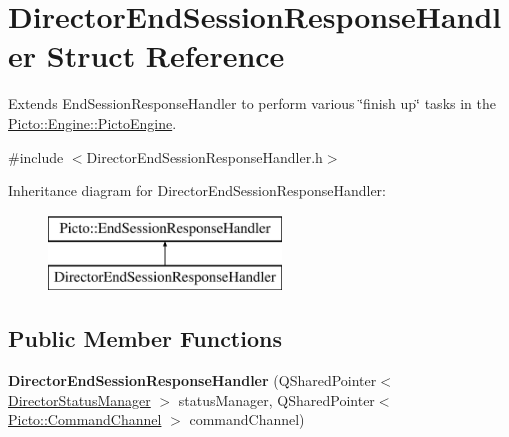\hypertarget{struct_director_end_session_response_handler}{\section{Director\-End\-Session\-Response\-Handler Struct Reference}
\label{struct_director_end_session_response_handler}
}


Extends End\-Session\-Response\-Handler to perform various \char`\"{}finish up\char`\"{} tasks in the \hyperlink{class_picto_1_1_engine_1_1_picto_engine}{Picto\-::\-Engine\-::\-Picto\-Engine}.  




{\ttfamily \#include $<$Director\-End\-Session\-Response\-Handler.\-h$>$}

Inheritance diagram for Director\-End\-Session\-Response\-Handler\-:\begin{figure}[H]
\begin{center}
\leavevmode
\includegraphics[height=2.000000cm]{struct_director_end_session_response_handler}
\end{center}
\end{figure}
\subsection*{Public Member Functions}
\begin{DoxyCompactItemize}
\item 
\hypertarget{struct_director_end_session_response_handler_ae2d34163b016333b39c2b6854a2e45f7}{{\bfseries Director\-End\-Session\-Response\-Handler} (Q\-Shared\-Pointer$<$ \hyperlink{class_director_status_manager}{Director\-Status\-Manager} $>$ status\-Manager, Q\-Shared\-Pointer$<$ \hyperlink{class_picto_1_1_command_channel}{Picto\-::\-Command\-Channel} $>$ command\-Channel)}\label{struct_director_end_session_response_handler_ae2d34163b016333b39c2b6854a2e45f7}

\end{DoxyCompactItemize}
